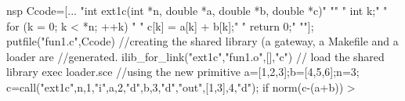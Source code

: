 \begin{examples}
\begin{mintednsp}{nsp}
Ccode=[...
"int ext1c(int *n, double *a, double *b, double *c)"
"{"
"   int k;"
"   for (k = 0; k < *n; ++k) "
"      c[k] = a[k] + b[k];"
"   return 0;"
"}"];
putfile("fun1.c",Ccode)
//creating the shared library (a gateway, a Makefile and a loader are
//generated. 
ilib_for_link("ext1c","fun1.o",[],"c") 
// load the shared library 
exec loader.sce 
//using the new primitive
a=[1,2,3];b=[4,5,6];n=3;
c=call("ext1c",n,1,"i",a,2,"d",b,3,"d","out",[1,3],4,"d");
if norm(c-(a+b)) > %
\end{mintednsp}
\end{examples}
\begin{manseealso}
\end{manseealso}

